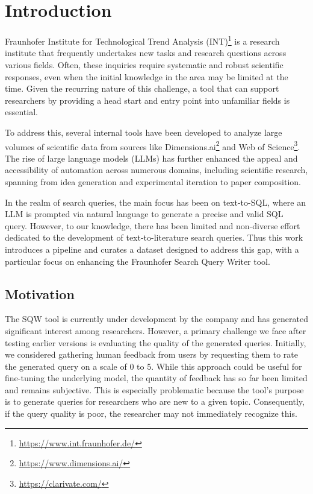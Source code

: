 \chapter{Introduction}\label{ch:intro}
Fraunhofer Institute for Technological Trend Analysis (INT)\footnote{\url{https://www.int.fraunhofer.de/}} is a research institute that frequently undertakes new tasks and research questions across various fields. Often, these inquiries require systematic and robust scientific responses, even when the initial knowledge in the area may be limited at the time. Given the recurring nature of this challenge, a tool that can support researchers by providing a head start and entry point into unfamiliar fields is essential.

To address this, several internal tools have been developed to analyze large volumes of scientific data from sources like Dimensions.ai\footnote{\url{https://www.dimensions.ai/}} and Web of Science\footnote{\url{https://clarivate.com/}}. The rise of large language models (LLMs) has further enhanced the appeal and accessibility of automation across numerous domains, including scientific research, spanning from idea generation and experimental iteration to paper composition\autocite{lu2024aiscientistfullyautomated}.

In the realm of search queries, the main focus has been on text-to-SQL\autocite{dong2023c3}, where an LLM is prompted via natural language to generate a precise and valid SQL query. However, to our knowledge, there has been limited and non-diverse effort dedicated to the development of text-to-literature search queries. Thus this work introduces a pipeline and curates a dataset designed to address this gap, with a particular focus on enhancing the Fraunhofer Search Query Writer tool.

\section{Motivation}
The SQW tool is currently under development by the company and has generated significant interest among researchers. However, a primary challenge we face after testing earlier versions is evaluating the quality of the generated queries. Initially, we considered gathering human feedback from users by requesting them to rate the generated query on a scale of 0 to 5. While this approach could be useful for fine-tuning the underlying model, the quantity of feedback has so far been limited and remains subjective. This is especially problematic because the tool’s purpose is to generate queries for researchers who are new to a given topic. Consequently, if the query quality is poor, the researcher may not immediately recognize this.

